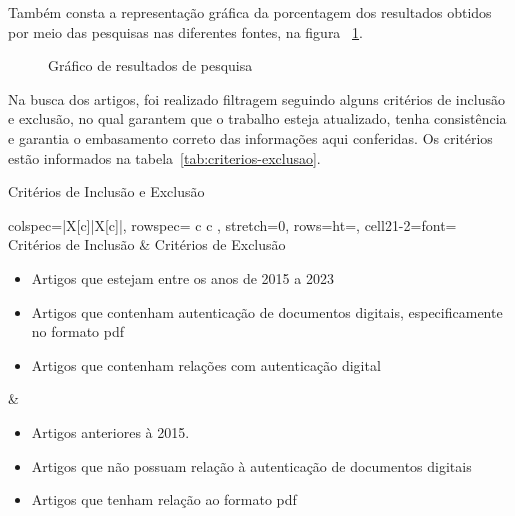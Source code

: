 Também consta a representação gráfica da porcentagem dos resultados obtidos
por meio das pesquisas nas diferentes fontes, na figura
~\ref{fig:grafico-resultados-pesquisa}.

\begin{figure}[h!]
    \caption[Gráfico de resultados da pesquisa]{Gráfico de resultados de
    pesquisa}
    \sourcesearchfootnote
    \label{fig:grafico-resultados-pesquisa}
\end{figure}

Na busca dos artigos, foi realizado filtragem seguindo alguns
critérios de inclusão e exclusão, no qual garantem que o trabalho
esteja atualizado, tenha consistência e garantia o embasamento
correto das informações aqui conferidas.
Os critérios estão informados na tabela~\ref{tab:criterios-exclusao}.

\begin{table}[h]
    \caption[Critérios de Inclusão e Exclusão]{Critérios de Inclusão e Exclusão}
    \begin{tblr}{
        colspec={|X[c]|X[c]|},
        rowspec={ c c },
        stretch=0,
        rows={ht=\baselineskip},
        cell{2}{1-2}={font=\small}
    }
        \hline
        Critérios de Inclusão & Critérios de Exclusão \\ \hline
        \begin{itemize}[leftmargin=10px]
            \item Artigos que estejam entre os anos de 2015 a 2023
            \item Artigos que contenham autenticação de documentos digitais,
            especificamente no formato \acrshort{pdf}
            \item Artigos que contenham relações com autenticação digital
        \end{itemize} &
        \begin{itemize}[leftmargin=10px]
            \item Artigos anteriores à 2015.
            \item Artigos que não possuam relação à autenticação de
            documentos digitais
            \item Artigos que tenham relação ao formato \acrshort{pdf}
        \end{itemize} \\ \hline
    \end{tblr}
    \sourcesearchfootnote
    \label{tab:criterios-exclusao}
\end{table}

